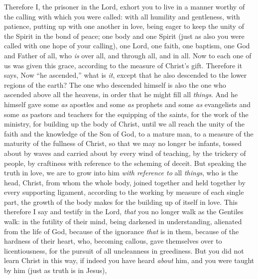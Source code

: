 \begin{biblechapter} %
 Therefore I, the prisoner in the Lord, exhort you to live in a manner worthy of the calling with which you were called:
\verse with all humility and gentleness, with patience, putting up with one another in love,
\verse being eager to keep the unity of the Spirit in the bond of peace;
\verse one body and one Spirit (just as also you were called with one hope of your calling),
\verse one Lord, one faith, one baptism,
\verse one God and Father of all, who \textit{is} over all, and through all, and in all.
 Now to each one of us was given this grace, according to the measure of Christ’s gift.
\verse Therefore it says,
\verse Now “he ascended,” what is \textit{it}, except that he also descended to the lower regions of the earth?
\verse The one who descended himself is also the one who ascended above all the heavens, in order that he might fill all \textit{things}.
\verse And he himself gave some \textit{as} apostles and some \textit{as} prophets and some \textit{as} evangelists and some \textit{as} pastors and teachers
\verse for the equipping of the saints, for the work of the ministry, for building up the body of Christ,
\verse until we all reach the unity of the faith and the knowledge of the Son of God, to a mature man, to a measure of the maturity of the fullness of Christ,
\verse so that we may no longer be infants, tossed about by waves and carried about by every wind of teaching, by the trickery of people, by craftiness with reference to the scheming of deceit.
\verse But speaking the truth in love, we are to grow into him \textit{with reference to} all \textit{things}, who is the head, Christ,
\verse from whom the whole body, joined together and held together by every supporting ligament, according to the working by measure of each single part, the growth of the body makes for the building up of itself in love.
 This therefore I say and testify in the Lord, \textit{that} you no longer walk as the Gentiles walk: in the futility of their mind,
\verse being darkened in understanding, alienated from the life of God, because of the ignorance \textit{that} is in them, because of the hardness of their heart,
\verse who, becoming callous, gave themselves over to licentiousness, for the pursuit of all uncleanness in greediness.
\verse But you did not learn Christ in this way,
\verse if indeed you have heard \textit{about} him, and you were taught by him (just as truth is in Jesus),

\end{biblechapter}

